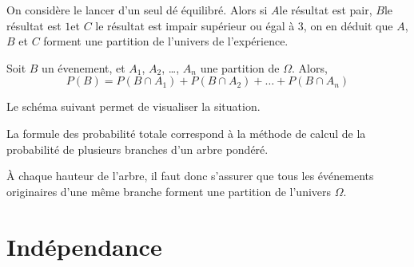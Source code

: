 \documentclass{article}
\begin{document}
\begin{example}
On considère le lancer d'un seul dé équilibré. Alors si $A$\og le résultat est pair\fg, $B$\og le résultat est $1$\fg et $C$ \og le résultat est impair supérieur ou égal à $3$\fg, on en déduit que $A$, $B$ et $C$ forment une partition de l'univers de l'expérience.
\end{example}

\begin{proposition}
Soit $B$ un évenement, et $A_1$, $A_2$, \dots, $A_n$ une partition de $\Omega$. Alors,
\begin{equation*}
P(B) = P(B \cap A_1) + P(B \cap A_2) + \dots + P(B \cap A_n)
\end{equation*}
\end{proposition}

\begin{remark}
Le schéma suivant permet de visualiser la situation.
\begin{center}
\end{center}
\end{remark}

\begin{remark}
La formule des probabilité totale correspond à la méthode de calcul de la probabilité de plusieurs branches d'un arbre pondéré.

À chaque hauteur de l'arbre, il faut donc s'assurer que tous les événements originaires d'une même branche forment une partition de l'univers $\Omega$. 
\end{remark}

\newpage

\section{Indépendance}
\end{document}
